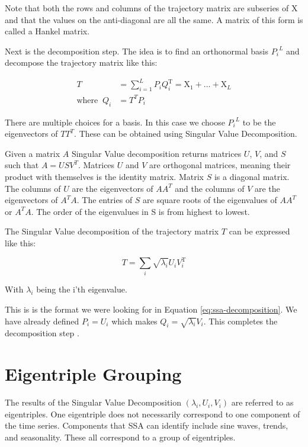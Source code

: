 Note that both the rows and columns of the trajectory matrix are subseries of X and that the values on the anti-diagonal are all the same. A matrix of this form is called a Hankel matrix. 

Next is the decomposition step. The idea is to find an orthonormal basis ${P_i}^L$ and decompose the trajectory matrix like this: 

\begin{equation}
   \begin{aligned}
   T&=\sum_{i=1}^{L} P_{i} Q_{i}^{\mathrm{T}}=\mathrm{X}_{1}+\ldots+\mathrm{X}_{L} \\
   \text{where} \;\; Q_i &= T^TP_i
   \end{aligned}
   \label{eq:ssa-decomposition}
\end{equation}

There are multiple choices for a basis. In this case we choose ${P_i}^L$ to be the eigenvectors of $TT^T$. These can be obtained using Singular Value Decomposition. 

Given a matrix $A$ Singular Value decomposition returns matrices $U$, $V$, and $S$ such that $A = USV^T$. Matrices $U$ and $V$ are orthogonal matrices, meaning their product with themselves is the identity matrix. Matrix $S$ is a diagonal matrix. The columns of $U$ are the eigenvectors of $AA^T$ and the columns of $V$ are the eigenvectors of $A^TA$. The entries of $S$ are square roots of the eigenvalues of $AA^T$ or $A^TA$. The order of the eigenvalues in S is from highest to lowest. 

The Singular Value decomposition of the trajectory matrix $T$ can be expressed like this: 

\begin{equation}
T=\sum_{i} \sqrt{\lambda_{i}} U_{i} V_{i}^{\mathrm{T}}
\end{equation}

With $\lambda_i$ being the i'th eigenvalue.

This is is the format we were looking for in Equation \eqref{eq:ssa-decomposition}. We have already defined $P_i=U_i$ which makes $Q_i = \sqrt{\lambda_i}V_i$. This completes the decomposition step \parencite{golyandina2014basic}.

\section{Eigentriple Grouping}

The results of the Singular Value Decomposition $(\lambda_i, U_i, V_i)$ are referred to as eigentriples. One eigentriple does not necessarily correspond to one component of the time series. Components that SSA can identify include sine waves, trends, and seasonality. These all correspond to a group of eigentriples. 

